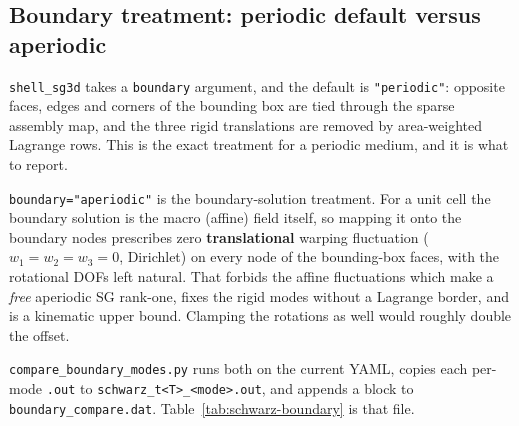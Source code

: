 \subsection{Boundary treatment: periodic default versus aperiodic}

\texttt{shell\_sg3d} takes a \texttt{boundary} argument, and the default is
\texttt{"periodic"}: opposite faces, edges and corners of the bounding box are
tied through the sparse assembly map, and the three rigid translations are
removed by area-weighted Lagrange rows. This is the exact treatment for a
periodic medium, and it is what to report.

\texttt{boundary="aperiodic"} is the boundary-solution treatment. For a unit cell
the boundary solution is the macro (affine) field itself, so mapping it onto the
boundary nodes prescribes zero \textbf{translational} warping fluctuation
($w_1=w_2=w_3=0$, Dirichlet) on every node of the bounding-box faces, with the
rotational DOFs left natural. That forbids the affine fluctuations which make a
\emph{free} aperiodic SG rank-one, fixes the rigid modes without a Lagrange
border, and is a kinematic upper bound. Clamping the rotations as well would
roughly double the offset.

\texttt{compare\_boundary\_modes.py} runs both on the current YAML, copies each
per-mode \texttt{.out} to \texttt{schwarz\_t<T>\_<mode>.out}, and appends a block
to \texttt{boundary\_compare.dat}. Table~\ref{tab:schwarz-boundary} is that file.

